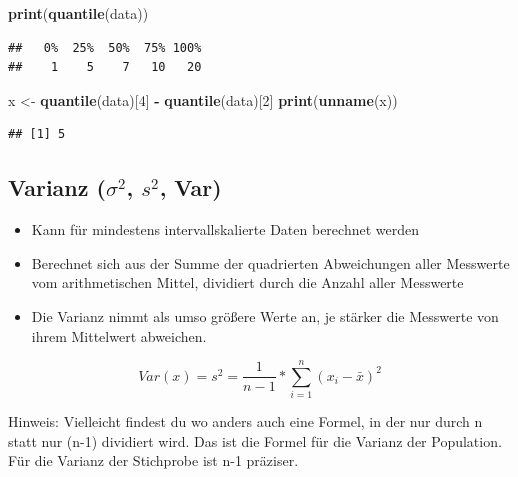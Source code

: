 \documentclass[
]{book}
\newenvironment{Shaded}{\begin{snugshade}}{\end{snugshade}}
\newcommand{\DecValTok}[1]{\textcolor[rgb]{0.00,0.00,0.81}{#1}}
\newcommand{\KeywordTok}[1]{\textcolor[rgb]{0.13,0.29,0.53}{\textbf{#1}}}
\newcommand{\NormalTok}[1]{#1}
\newcommand{\OperatorTok}[1]{\textcolor[rgb]{0.81,0.36,0.00}{\textbf{#1}}}
\newcommand{\StringTok}[1]{\textcolor[rgb]{0.31,0.60,0.02}{#1}}
\providecommand{\tightlist}{%
  \setlength{\itemsep}{0pt}\setlength{\parskip}{0pt}}
\begin{document}
\begin{Shaded}
\begin{Highlighting}[]
\KeywordTok{print}\NormalTok{(}\KeywordTok{quantile}\NormalTok{(data))}
\end{Highlighting}
\end{Shaded}

\begin{verbatim}
##   0%  25%  50%  75% 100% 
##    1    5    7   10   20
\end{verbatim}

\begin{Shaded}
\begin{Highlighting}[]
\NormalTok{x <-}\StringTok{ }\KeywordTok{quantile}\NormalTok{(data)[}\DecValTok{4}\NormalTok{] }\OperatorTok{-}\StringTok{ }\KeywordTok{quantile}\NormalTok{(data)[}\DecValTok{2}\NormalTok{] }
\KeywordTok{print}\NormalTok{(}\KeywordTok{unname}\NormalTok{(x))}
\end{Highlighting}
\end{Shaded}

\begin{verbatim}
## [1] 5
\end{verbatim}

\hypertarget{varianz-sigma2-s2-var}{%
\subsection{\texorpdfstring{Varianz (\(\sigma^2\), \(s^2\), Var)}{Varianz (\textbackslash sigma\^{}2, s\^{}2, Var)}}\label{varianz-sigma2-s2-var}}

\begin{itemize}
\tightlist
\item
  Kann für mindestens intervallskalierte Daten berechnet werden
\item
  Berechnet sich aus der Summe der quadrierten Abweichungen aller Messwerte vom arithmetischen Mittel, dividiert durch die Anzahl aller Messwerte
\item
  Die Varianz nimmt als umso größere Werte an, je stärker die Messwerte von ihrem Mittelwert abweichen.
\end{itemize}

\[ Var(x) = s^2 = \frac{1}{n-1}*\sum_{i=1}^{n}\left( x_i - \bar{x}  \right)^2\]

Hinweis: Vielleicht findest du wo anders auch eine Formel, in der nur durch n statt nur (n-1) dividiert wird. Das ist die Formel für die Varianz der Population. Für die Varianz der Stichprobe ist n-1 präziser.
\end{document}

